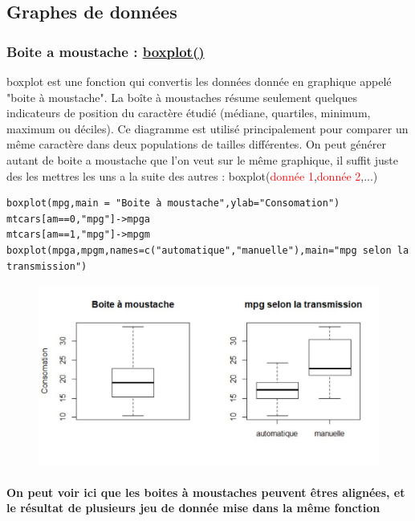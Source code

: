 \documentclass{article}
\newcommand{\argument}[1]{\textcolor{red}{#1}}
\begin{document}
\subsection{Graphes de données}
\subsubsection{Boite a moustache : \href{https://www.rdocumentation.org/packages/graphics/versions/3.6.2/topics/boxplot}{boxplot()} }
boxplot est une fonction qui convertis les données donnée en graphique appelé "boite à moustache". 
La boîte à moustaches résume seulement quelques indicateurs de position du caractère étudié (médiane, quartiles, minimum, maximum ou déciles). Ce diagramme est utilisé principalement pour comparer un même caractère dans deux populations de tailles différentes. \newline
On peut générer autant de boite a moustache que l'on veut sur le même graphique, il suffit juste des les mettres les uns a la suite des autres : boxplot(\argument{donnée 1},\argument{donnée 2},...)

\begin{verbatim}
boxplot(mpg,main = "Boite à moustache",ylab="Consomation")
mtcars[am==0,"mpg"]->mpga
mtcars[am==1,"mpg"]->mpgm
boxplot(mpga,mpgm,names=c("automatique","manuelle"),main="mpg selon la transmission")
\end{verbatim}

\begin{figure}[!h]
    \centering
    \includegraphics[scale=0.9]{image_moustache.JPG}
\end{figure}

\paragraph{On peut voir ici que les boites à moustaches peuvent êtres alignées, et le résultat de plusieurs jeu de donnée mise dans la même fonction}
\end{document}
